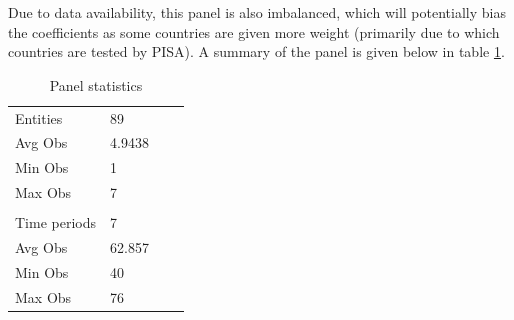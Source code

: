 \documentclass[11pt]{article}
\begin{document}
Due to data availability, this panel is also imbalanced, which will potentially bias the coefficients as some countries are given more weight (primarily due to which countries are tested by PISA). A summary of the panel is given below in table \ref{table:panel-stats}.
\begin{table}[H]
    \caption{Panel statistics}
    \label{table:panel-stats}
    \centering
    \begin{tabular}{llll}
    Entities     & 89     &  &   \\
    Avg Obs      & 4.9438 &  &   \\
    Min Obs      & 1      &  &   \\
    Max Obs      & 7      &  &   \\
                 &        &  &   \\
    Time periods & 7      &  &   \\
    Avg Obs      & 62.857 &  &   \\
    Min Obs      & 40     &  &   \\
    Max Obs      & 76     &  &  
    \end{tabular}
\end{table}
\end{document}
